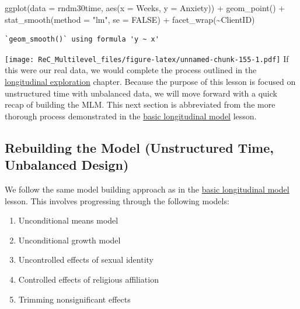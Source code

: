 \documentclass[
  11pt,
]{book}
\newenvironment{Shaded}{\begin{snugshade}}{\end{snugshade}}
\newcommand{\AttributeTok}[1]{\textcolor[rgb]{0.77,0.63,0.00}{#1}}
\newcommand{\ConstantTok}[1]{\textcolor[rgb]{0.00,0.00,0.00}{#1}}
\newcommand{\FunctionTok}[1]{\textcolor[rgb]{0.00,0.00,0.00}{#1}}
\newcommand{\NormalTok}[1]{#1}
\newcommand{\SpecialCharTok}[1]{\textcolor[rgb]{0.00,0.00,0.00}{#1}}
\newcommand{\StringTok}[1]{\textcolor[rgb]{0.31,0.60,0.02}{#1}}
\providecommand{\tightlist}{%
  \setlength{\itemsep}{0pt}\setlength{\parskip}{0pt}}
\begin{document}
\begin{Shaded}
\begin{Highlighting}[]
\FunctionTok{ggplot}\NormalTok{(}\AttributeTok{data =}\NormalTok{ rndm30time, }\FunctionTok{aes}\NormalTok{(}\AttributeTok{x =}\NormalTok{ Weeks, }\AttributeTok{y =}\NormalTok{ Anxiety)) }\SpecialCharTok{+} \FunctionTok{geom\_point}\NormalTok{() }\SpecialCharTok{+}
    \FunctionTok{stat\_smooth}\NormalTok{(}\AttributeTok{method =} \StringTok{"lm"}\NormalTok{, }\AttributeTok{se =} \ConstantTok{FALSE}\NormalTok{) }\SpecialCharTok{+} \FunctionTok{facet\_wrap}\NormalTok{(}\SpecialCharTok{\textasciitilde{}}\NormalTok{ClientID)}
\end{Highlighting}
\end{Shaded}

\begin{verbatim}
`geom_smooth()` using formula 'y ~ x'
\end{verbatim}

\texttt{[image: ReC\_Multilevel\_files/figure-latex/unnamed-chunk-155-1.pdf]}
If this were our real data, we would complete the process outlined in the \href{MLMexplore}{longitudinal exploration} chapter. Because the purpose of this lesson is focused on unstructured time with unbalanced data, we will move forward with a quick recap of building the MLM. This next section is abbreviated from the more thorough process demonstrated in the \href{LongMod}{basic longitudinal model} lesson.

\hypertarget{rebuilding-the-model-unstructured-time-unbalanced-design}{%
\subsection{Rebuilding the Model (Unstructured Time, Unbalanced Design)}\label{rebuilding-the-model-unstructured-time-unbalanced-design}}

We follow the same model building approach as in the \href{LongMod}{basic longitudinal model} lesson. This involves progressing through the following models:

\begin{enumerate}
\def\labelenumi{\arabic{enumi}.}
\tightlist
\item
  Unconditional means model
\item
  Unconditional growth model
\item
  Uncontrolled effects of sexual identity
\item
  Controlled effects of religious affiliation
\item
  Trimming nonsignificant effects
\end{enumerate}
\end{document}
